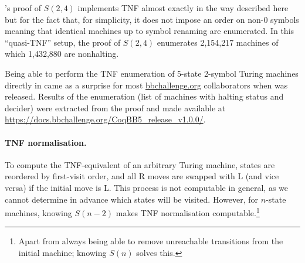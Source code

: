 \CoqBB's proof of $S(2,4)$ implements TNF almost exactly in the way described here but for the fact that, for simplicity, it does not impose an order on non-0 symbols meaning that identical machines up to symbol renaming are enumerated. In this ``quasi-TNF'' setup, the proof of $S(2,4)$ enumerates 2,154,217 machines of which 1,432,880 are nonhalting.

Being able to perform the TNF enumeration of 5-state 2-symbol Turing machines directly in \Coq came as a surprise for most \url{bbchallenge.org} collaborators when \CoqBB was released. Results of the enumeration (\ie list of machines with halting status and decider) were extracted from the proof and made available at \url{https://docs.bbchallenge.org/CoqBB5_release_v1.0.0/}.




\paragraph{TNF normalisation.} To compute the TNF-equivalent of an arbitrary Turing machine, states are reordered by first-visit order, and all R moves are swapped with L (and vice versa) if the initial move is L. This process is not computable in general, as we cannot determine in advance which states will be visited. However, for $n$-state machines, knowing $S(n-2)$ makes TNF normalisation computable.\footnote{Apart from always being able to remove unreachable transitions from the initial machine; knowing $S(n)$ solves this.} %

